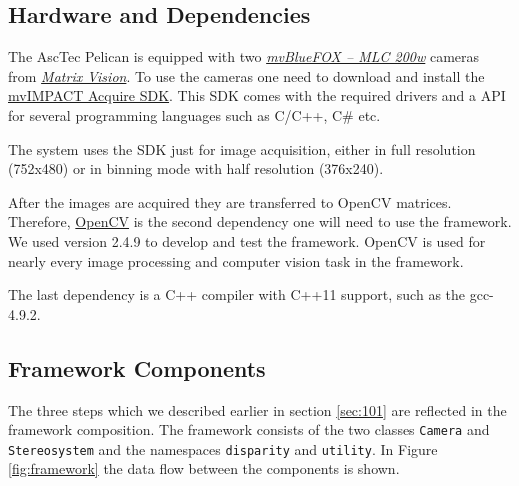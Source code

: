 \documentclass[11pt]{article}
\begin{document}
\subsection{Hardware and Dependencies}\label{sec:hardware}
The AscTec Pelican is equipped with two  \emph{\href{http://www.matrix-vision.com/USB2.0-single-board-camera-mvbluefox-mlc.html?camera=mvBlueFOX-MLC200wC&selectInterface=Alle&selectMpixels=Alle&selectFps=Alle&selectSensor=Alle&selectColor=Alle&selectSize=Alle&selectShutter=Alle&selectModel=Alle&col=1&row=0}{mvBlueFOX -- MLC 200w}} cameras from \emph{\href{http://www.matrix-vision.com/home-en.html}{Matrix Vision}}. To use the cameras one need to download and install the \href{http://www.matrix-vision.com/programming-interface-mvimpact-acquire.html}{mvIMPACT Acquire SDK}. This SDK comes with the required drivers and a API for several programming languages such as C/C++, C\# etc. 

The system uses the SDK just for image acquisition, either in full resolution (752x480) or in binning mode with half resolution (376x240).

After the images are acquired they are transferred to OpenCV matrices. Therefore, \href{http://opencv.org/}{OpenCV} is the second dependency one will need to use the framework. We used version 2.4.9 to develop and test the framework. OpenCV is used for nearly every image processing and computer vision task in the framework.

The last dependency is a C++ compiler with C++11 support, such as the gcc-4.9.2.

\subsection{Framework Components}
The three steps which we described earlier in section \ref{sec:101} are reflected in the framework composition. The framework consists of the two classes \texttt{Camera} and \texttt{Stereosystem} and the namespaces \texttt{disparity} and \texttt{utility}. In Figure \ref{fig:framework} the data flow between the components is shown.
\end{document}
